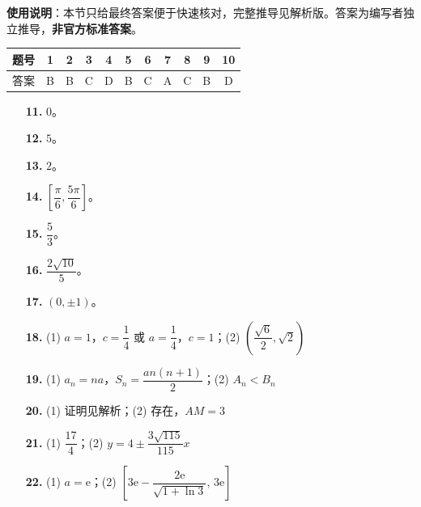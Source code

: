 
\begin{gknotice}
\textbf{使用说明}：本节只给最终答案便于快速核对，完整推导见解析版。答案为编写者独立推导，\textbf{非官方标准答案}。
\end{gknotice}

\begin{center}\begin{tabular}{ccccccccccc}
\toprule
题号 & 1 & 2 & 3 & 4 & 5 & 6 & 7 & 8 & 9 & 10 \\
\midrule
答案 & B & B & C & D & B & C & A & C & B & D \\
\bottomrule
\end{tabular}\end{center}

\begin{itemize}[leftmargin=2.6em]
  \item[\textbf{11.}] $0$。
  \item[\textbf{12.}] $5$。
  \item[\textbf{13.}] $2$。
  \item[\textbf{14.}] $\left[\dfrac\pi6,\dfrac{5\pi}6\right]$。
  \item[\textbf{15.}] $\dfrac53$。
  \item[\textbf{16.}] $\dfrac{2\sqrt{10}}5$。
  \item[\textbf{17.}] $(0,\pm1)$。
\end{itemize}

\begin{itemize}[leftmargin=2.6em]
  \item[\textbf{18.}] (1) $a=1$，$c=\dfrac14$ 或 $a=\dfrac14$，$c=1$；(2) $\left(\dfrac{\sqrt6}2,\sqrt2\right)$
  \item[\textbf{19.}] (1) $a_n=na$，$S_n=\dfrac{a n(n+1)}2$；(2) $A_n<B_n$
  \item[\textbf{20.}] (1) 证明见解析；(2) 存在，$AM=3$
  \item[\textbf{21.}] (1) $\dfrac{17}4$；(2) $y=4\pm\dfrac{3\sqrt{115}}{115}x$
  \item[\textbf{22.}] (1) $a=\mathrm e$；(2) $\left[3\mathrm e-\dfrac{2\mathrm e}{\sqrt{1+\ln3}},\,3\mathrm e\right]$
\end{itemize}
